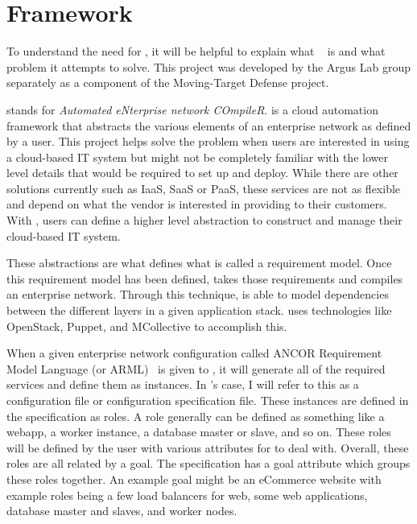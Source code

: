 \section{\ancor{} Framework}
\label{makereference1.1}

To understand the need for \projectName{}, it will be helpful to explain what \ancor{} ~\cite{DMatrix:Unruh:2014} is and what problem it attempts to solve. This project was developed by the Argus Lab group \cite{Note:ArgusLab:2014} separately as a component of the Moving-Target Defense project.

\ancor{} stands for \emph{Automated eNterprise network COmpileR}. \ancor{} is a cloud automation framework that abstracts the various elements of an enterprise network as defined by a user. This project helps solve the problem when users are interested in using a cloud-based IT system but might not be completely familiar with the lower level details that would be required to set up and deploy. While there are other solutions currently such as IaaS, SaaS or PaaS, these services are not as flexible and depend on what the vendor is interested in providing to their customers. With \ancor{}, users can define a higher level abstraction to construct and manage their cloud-based IT system.

These abstractions are what defines what is called a requirement model. Once this requirement model has been defined, \ancor{} takes those requirements and compiles an enterprise network. Through this technique, \ancor{} is able to model dependencies between the different layers in a given application stack. \ancor{} uses technologies like OpenStack, Puppet, and MCollective to accomplish this.

When a given enterprise network configuration called ANCOR Requirement Model Language (or ARML)~\cite{DMatrix:Unruh:2014} is given to \ancor{}, it will generate all of the required services and define them as instances. In \projectName{}'s case, I will refer to this as a configuration file or configuration specification file. These instances are defined in the specification as roles. A role generally can be defined as something like a webapp, a worker instance, a database master or slave, and so on. These roles will be defined by the user with various attributes for \ancor{} to deal with. Overall, these roles are all related by a goal. The specification has a goal attribute which groups these roles together. An example goal might be an eCommerce website with example roles being a few load balancers for web, some web applications, database master and slaves, and worker nodes.

